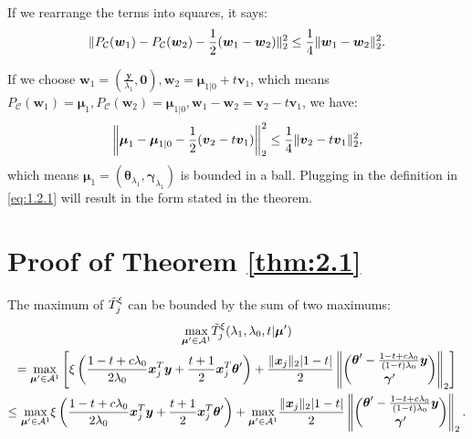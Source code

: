 If we rearrange the terms into squares, it says:
\begin{equation}
    \lVert P_{\mathcal{C}}(\boldsymbol w_1)-P_{\mathcal{C}}(\boldsymbol w_2)-\frac{1}{2}(\boldsymbol w_1-\boldsymbol w_2)\rVert_2^2\leq\frac{1}{4}\lVert\boldsymbol w_1-\boldsymbol w_2\rVert_2^2.
\end{equation}

If we choose $\boldsymbol w_1=(\frac{\boldsymbol y}{\lambda_1},\boldsymbol0),\boldsymbol w_2=\boldsymbol\mu_{1|0}+t\boldsymbol v_1$, which means $P_{\mathcal{C}}(\boldsymbol w_1)=\boldsymbol\mu_1,P_{\mathcal{C}}(\boldsymbol w_2)=\boldsymbol\mu_{1|0},\boldsymbol w_1-\boldsymbol w_2=\boldsymbol v_2-t\boldsymbol v_1$, we have:
\begin{equation}
    \left\Vert\boldsymbol\mu_1-\boldsymbol\mu_{1|0}-\frac{1}{2}(\boldsymbol v_2-t\boldsymbol v_1)\right\Vert_2^2\leq\frac{1}{4}\lVert\boldsymbol v_2-t\boldsymbol v_1\rVert_2^2,
\end{equation}
which means $\boldsymbol\mu_1=(\boldsymbol\theta_{\lambda_1},\boldsymbol\gamma_{\lambda_1})$ is bounded in a ball. Plugging in the definition in \eqref{eq:1.2.1} will result in the form stated in the theorem.

\section{Proof of Theorem \ref{thm:2.1}}

The maximum of $\Tilde{T}^\xi_j$ can be bounded by the sum of two maximums:
\begin{equation}
    \begin{gathered}
        \underset{\boldsymbol\mu'\in\mathcal{A}^1}{\mathrm{max}}\Tilde{T}^\xi_j(\lambda_1,\lambda_0,t|\boldsymbol\mu')\\
        =\underset{\boldsymbol\mu'\in\mathcal{A}^1}{\mathrm{max}}\left[\xi\left( \frac{1-t+c\lambda_0}{2\lambda_0}\boldsymbol x_j^T\boldsymbol y+\frac{t+1}{2}\boldsymbol x_j^T\boldsymbol\theta'\right)+\frac{\lVert\boldsymbol x_j\rVert_2|1-t|}{2}\left\Vert\binom{\boldsymbol\theta'-\frac{1-t+c\lambda_0}{(1-t)\lambda_0}\boldsymbol y}{\boldsymbol\gamma'}\right\Vert_2\right]\\
        \leq \underset{\boldsymbol\mu'\in\mathcal{A}^1}{\mathrm{max}}\xi\left( \frac{1-t+c\lambda_0}{2\lambda_0}\boldsymbol x_j^T\boldsymbol y+\frac{t+1}{2}\boldsymbol x_j^T\boldsymbol\theta'\right)+\underset{\boldsymbol\mu'\in\mathcal{A}^1}{\mathrm{max}}\frac{\lVert\boldsymbol x_j\rVert_2|1-t|}{2}\left\Vert\binom{\boldsymbol\theta'-\frac{1-t+c\lambda_0}{(1-t)\lambda_0}\boldsymbol y}{\boldsymbol\gamma'}\right\Vert_2.
    \end{gathered}
\end{equation}

